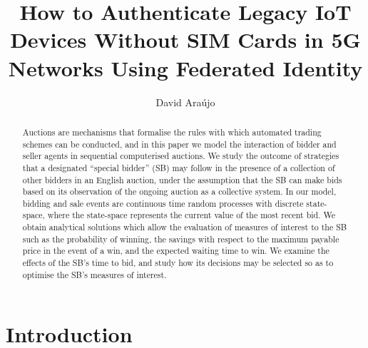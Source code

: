 \documentclass{comjnl}
\begin{document}
\title[How to Authenticate Legacy IoT Devices Without SIM Cards in 5G Networks Using Federated Identity]{How to Authenticate Legacy IoT Devices Without SIM Cards in 5G Networks Using Federated Identity}
\author{David Araújo}
 

 



\begin{abstract}
Auctions are mechanisms that formalise the rules with which
automated trading schemes can be conducted, and in this paper we
model the interaction of bidder and seller agents in sequential
computerised auctions. We study the outcome of strategies that a
designated ``special bidder'' (SB) may follow in the presence of a
collection of other bidders in an English auction, under the
assumption that the SB can make bids based on its observation of
the ongoing auction as a collective system. In our model, bidding
and sale events are continuous time random processes with discrete
state-space, where the state-space represents the current value of
the most recent bid. We obtain analytical solutions which allow
the evaluation of measures of interest to the SB such as the
probability of winning, the savings with respect to the maximum
payable price in the event of a win, and the expected waiting time
to win. We examine the effects of the SB's time to bid, and study
how its decisions may be selected so as to optimise the SB's
measures of interest.
\end{abstract}

\maketitle

\section{Introduction}

\begin{figure}
\centering
\end{figure}
\end{document}
